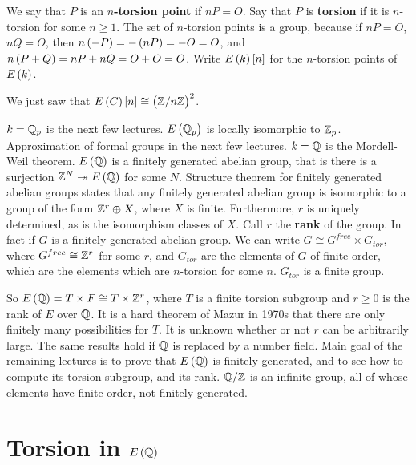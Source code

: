 \begin{definition}
We say that $ P $ is an \textbf{$ n $-torsion point} if $ nP = O $. Say that $ P $ is \textbf{torsion} if it is $ n $-torsion for some $ n \ge 1 $. The set of $ n $-torsion points is a group, because if $ nP = O $, $ nQ = O $, then $ n\br{-P} = -\br{nP} = -O = O $, and $ n\br{P + Q} = nP + nQ = O + O = O $. Write $ E\br{k}\sbr{n} $ for the $ n $-torsion points of $ E\br{k} $.
\end{definition}

\begin{example*}
We just saw that $ E\br{C}\sbr{n} \cong \br{\Z / n\Z}^2 $.
\end{example*}

$ k = \mathbb{Q}_p $ is the next few lectures. $ E\br{\Q_p} $ is locally isomorphic to $ \mathbb{Z}_p $. Approximation of formal groups in the next few lectures. $ k = \mathbb{Q} $ is the Mordell-Weil theorem. $ E\br{\Q} $ is a finitely generated abelian group, that is there is a surjection $ \Z^N \twoheadrightarrow E\br{\Q} $ for some $ N $. Structure theorem for finitely generated abelian groups states that any finitely generated abelian group is isomorphic to a group of the form $ \mathbb{Z}^r \oplus X $, where $ X $ is finite. Furthermore, $ r $ is uniquely determined, as is the isomorphism classes of $ X $. Call $ r $ the \textbf{rank} of the group. In fact if $ G $ is a finitely generated abelian group. We can write $ G \cong G^{free} \times G_{tor} $, where $ G^{free} \cong \mathbb{Z}^r $ for some $ r $, and $ G_{tor} $ are the elements of $ G $ of finite order, which are the elements which are $ n $-torsion for some $ n $. $ G_{tor} $ is a finite group.


So $ E\br{\Q} = T \times F \cong T \times \Z^r $, where $ T $ is a finite torsion subgroup and $ r \ge 0 $ is the rank of $ E $ over $ \mathbb{Q} $. It is a hard theorem of Mazur in 1970s that there are only finitely many possibilities for $ T $. It is unknown whether or not $ r $ can be arbitrarily large. The same results hold if $ \mathbb{Q} $ is replaced by a number field. Main goal of the remaining lectures is to prove that $ E\br{\Q} $ is finitely generated, and to see how to compute its torsion subgroup, and its rank. $ \mathbb{Q} / \mathbb{Z} $ is an infinite group, all of whose elements have finite order, not finitely generated.

\pagebreak

\section{Torsion in \texorpdfstring{$ E\br{\Q} $}{E(Q)}}

